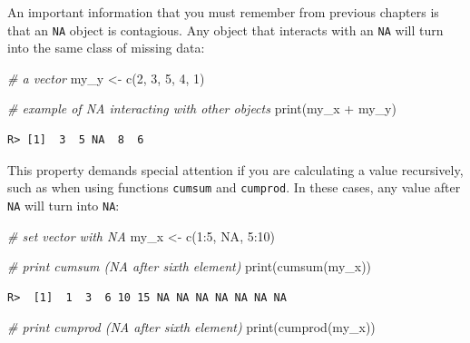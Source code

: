 \documentclass[
  12pt,
]{book}
\newenvironment{Shaded}{\begin{snugshade}}{\end{snugshade}}
\newcommand{\CommentTok}[1]{\textcolor[rgb]{0.37,0.37,0.37}{\textit{#1}}}
\newcommand{\ConstantTok}[1]{\textcolor[rgb]{0,0,0}{#1}}
\newcommand{\DecValTok}[1]{\textcolor[rgb]{0.06,0.06,0.06}{#1}}
\newcommand{\FunctionTok}[1]{\textcolor[rgb]{0,0,0}{#1}}
\newcommand{\NormalTok}[1]{#1}
\newcommand{\OtherTok}[1]{\textcolor[rgb]{0.37,0.37,0.37}{#1}}
\newcommand{\SpecialCharTok}[1]{\textcolor[rgb]{0,0,0}{#1}}
\begin{document}
An important information that you must remember from previous chapters is that an \texttt{NA} object is contagious. Any object that interacts with an \texttt{NA} will turn into the same class of missing data:

\begin{Shaded}
\begin{Highlighting}[]
\CommentTok{\# a vector }
\NormalTok{my\_y }\OtherTok{\textless{}{-}} \FunctionTok{c}\NormalTok{(}\DecValTok{2}\NormalTok{, }\DecValTok{3}\NormalTok{, }\DecValTok{5}\NormalTok{, }\DecValTok{4}\NormalTok{, }\DecValTok{1}\NormalTok{)}

\CommentTok{\# example of NA interacting with other objects}
\FunctionTok{print}\NormalTok{(my\_x }\SpecialCharTok{+}\NormalTok{ my\_y)}
\end{Highlighting}
\end{Shaded}

\begin{verbatim}
R> [1]  3  5 NA  8  6
\end{verbatim}

This property demands special attention if you are calculating a value recursively, such as when using functions \texttt{cumsum} and \texttt{cumprod}. In these cases, any value after \texttt{NA} will turn into \texttt{NA}:

\begin{Shaded}
\begin{Highlighting}[]
\CommentTok{\# set vector with NA}
\NormalTok{my\_x }\OtherTok{\textless{}{-}} \FunctionTok{c}\NormalTok{(}\DecValTok{1}\SpecialCharTok{:}\DecValTok{5}\NormalTok{, }\ConstantTok{NA}\NormalTok{, }\DecValTok{5}\SpecialCharTok{:}\DecValTok{10}\NormalTok{)}

\CommentTok{\# print cumsum (NA after sixth element)}
\FunctionTok{print}\NormalTok{(}\FunctionTok{cumsum}\NormalTok{(my\_x))}
\end{Highlighting}
\end{Shaded}

\begin{verbatim}
R>  [1]  1  3  6 10 15 NA NA NA NA NA NA NA
\end{verbatim}

\begin{Shaded}
\begin{Highlighting}[]
\CommentTok{\# print cumprod (NA after sixth element)}
\FunctionTok{print}\NormalTok{(}\FunctionTok{cumprod}\NormalTok{(my\_x))}
\end{Highlighting}
\end{Shaded}
\end{document}
